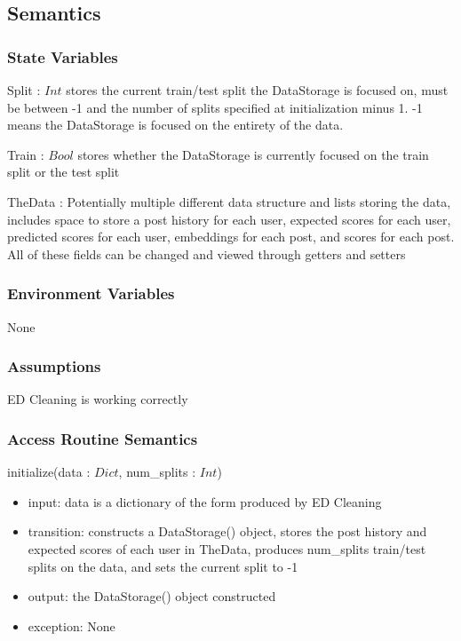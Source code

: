 \documentclass[12pt, titlepage]{article}
\begin{document}
\subsection{Semantics}

\subsubsection{State Variables}

Split : $Int$ stores the current train/test split the DataStorage is focused on, must be between -1 and the number of splits specified at initialization minus 1. -1 means the DataStorage is focused on the entirety of the data.

\noindent Train : $Bool$ stores whether the DataStorage is currently focused on the train split or the test split

\noindent TheData : Potentially multiple different data structure and lists storing the data, includes space to store a post history for each user, expected scores for each user, predicted scores for each user, embeddings for each post, and scores for each post. All of these fields can be changed and viewed through getters and setters

\subsubsection{Environment Variables}

None

\subsubsection{Assumptions}

ED Cleaning is working correctly

\subsubsection{Access Routine Semantics}

\noindent initialize(data : $Dict$, num\_splits : $Int$)
\begin{itemize}
\item input: data is a dictionary of the form produced by ED Cleaning
\item transition: constructs a DataStorage() object, stores the post history and expected scores of each user in TheData, produces num\_splits train/test splits on the data, and sets the current split to -1
\item output: the DataStorage() object constructed
\item exception: None
\end{itemize}
\end{document}
